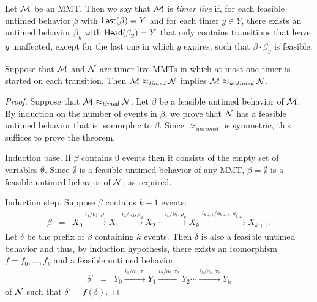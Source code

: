 
Let ${\cal M}$ be an MMT. Then we say that ${\cal M}$ is \emph{timer live} if, for each feasible untimed behavior $\beta$ with $\mathsf{Last}({\beta}) = Y$ and for each timer $y \in Y$, there exists an untimed behavior $\beta_y$ with $\mathsf{Head}({\beta_y}) = Y$ that only contains
transitions that leave $y$ unaffected, except for the last one in which $y$ expires, such that $\beta \cdot \beta_y$ is feasible.

\begin{theorem}
\label{timedimpliesuntimed}
Suppose that ${\cal M}$ and ${\cal N}$ are timer live MMTs in which at most one timer is started on each transition. Then
${\cal M} \approx_{\mathit{timed}} {\cal N}$
implies
${\cal M} \approx_{\mathit{untimed}} {\cal N}$.
\end{theorem}
\begin{proof}
Suppose that ${\cal M} \approx_{\mathit{timed}} {\cal N}$.
Let $\beta$ be a feasible untimed behavior of ${\cal M}$.
By induction on the number of events in $\beta$, we prove that ${\cal N}$ has a feasible untimed behavior that is isomorphic to $\beta$.
Since $\approx_{\mathit{untimed}}$ is symmetric, this suffices to prove the theorem.

Induction base. If $\beta$ contains $0$ events then it consists of the empty set of variables $\emptyset$.
Since $\emptyset$ is a feasible untimed behavior of any MMT, $\beta = \emptyset$ is a feasible untimed behavior of ${\cal N}$, as required.

Induction step. Suppose $\beta$ contains $k+1$ events:
\begin{eqnarray*}
\beta & = & X_0 \xrightarrow{i_1/o_1, \rho_1} X_1  \xrightarrow{i_2/o_2, \rho_2} X_2 \cdots \xrightarrow{i_k/o_k, \rho_k} X_{k}
 \xrightarrow{i_{k+1}/o_{k+1}, \rho_{k+1}} X_{k+1}.
\end{eqnarray*}
Let $\delta$ be the prefix of $\beta$ containing $k$ events. Then $\delta$ is also a feasible untimed behavior and thus, by
induction hypothesis, there exists an isomorphism $f = f_0 ,\ldots, f_k$ and a feasible untimed behavior
\begin{eqnarray*}
\delta' & = & Y_0 \xrightarrow{i_1/o_1, \tau_1} Y_1  \xrightarrow{i_2/o_2, \tau_2} Y_2 \cdots \xrightarrow{i_k/o_k, \tau_k} Y_{k}
\end{eqnarray*}
of ${\cal N}$ such that $\delta' = f(\delta)$.
\end{proof}

